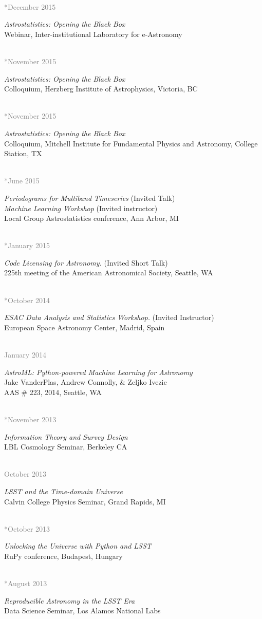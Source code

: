 \documentclass{article} %
\newlength\sidebarwidth
\newcommand{\dateonly}[2][]
	 {\begin{minipage}{\textwidth}
	 \vspace*{.4\baselineskip}
         \nopagebreak\hspace{0in}%
         \nopagebreak\begin{minipage}[t]{\sidebarwidth - .2cm}
         \raggedleft {~}
         {\\[-\baselineskip] \textcolor{gray}{\footnotesize #1}}
	 \end{minipage}%
	 \hfill
	 \begin{minipage}[t]{\linewidth - \sidebarwidth}
	 #2%
	 \end{minipage}%
	 \vspace*{.2\baselineskip plus 1\baselineskip minus
	 .2\baselineskip}%
	 \end{minipage}}
\begin{document}
  \dateonly[**December 2015]{
      {\it Astrostatistics: Opening the Black Box}\\
      Webinar, Inter-institutional Laboratory for e-Astronomy
  }

  \dateonly[**November 2015]{
      {\it Astrostatistics: Opening the Black Box}\\
      Colloquium, Herzberg Institute of Astrophysics, Victoria, BC
  }

  \dateonly[**November 2015]{
      {\it Astrostatistics: Opening the Black Box}\\
      Colloquium, Mitchell Institute for Fundamental Physics and Astronomy, College Station, TX
  }

  \dateonly[**June 2015]{
      {\it Periodograms for Multiband Timeseries} (Invited Talk)\\
      {\it Machine Learning Workshop} (Invited instructor)\\
      Local Group Astrostatistics conference, Ann Arbor, MI
    }

  \dateonly[**January 2015]{
    {\it Code Licensing for Astronomy.} (Invited Short Talk)\\
    225th meeting of the American Astronomical Society, Seattle, WA
  }

  \dateonly[**October 2014]{
    {\it ESAC Data Analysis and Statistics Workshop.} (Invited Instructor)\\
    European Space Astronomy Center, Madrid, Spain
  }

  \dateonly[January 2014]{
    {\it AstroML: Python-powered Machine Learning for Astronomy}\\
    Jake VanderPlas, Andrew Connolly, \& Zeljko Ivezic\\
    AAS \# 223, 2014, Seattle, WA
  }

  \dateonly[**November 2013]{
    {\it Information Theory and Survey Design}\\
    LBL Cosmology Seminar, Berkeley CA
  }

  \dateonly[October 2013]{
    {\it LSST and the Time-domain Universe}\\
    Calvin College Physics Seminar, Grand Rapids, MI
  }

  \dateonly[**October 2013]{
    {\it Unlocking the Universe with Python and LSST}\\
    RuPy conference, Budapest, Hungary
  }

  \dateonly[**August 2013]{
    {\it Reproducible Astronomy in the LSST Era}\\
    Data Science Seminar, Los Alamos National Labs
  }
\end{document}
